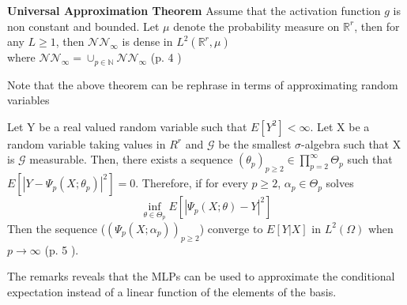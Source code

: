 \begin{theorem}\label{UniversalApproxTheorem}
\textbf{Universal Approximation Theorem} Assume that the activation function $g$ is non constant and bounded. Let $\mu$ denote the probability measure on $\mathbb{R}^r$, then for any $L\geq 1$, then $\mathcal{N} \mathcal{N}_\infty$ is dense in $L^2(\mathbb{R}^r, \mu)$\\
where $\mathcal{N} \mathcal{N}_\infty= \cup_{p\in \mathbb{N}} \mathcal{N} \mathcal{N}_\infty$
(p. 4 \parencite{Lelong19})
\end{theorem}
Note that the above theorem can be rephrase in terms of approximating random variables 
\begin{remark}
Let Y be a real valued random variable such that $E[Y^2]< \infty$. Let X be a random variable taking values in $R^r$ and $\mathcal{G}$ be the smallest $\sigma$-algebra such that X is $\mathcal{G}$ measurable. Then, there exists a sequence $(\theta_p)_{p\geq 2} \in \prod_{p=2}^{\infty} \Theta_{p}$ such that $E[|Y-\Psi_p(X;\theta_p)|^2]=0$. Therefore, if for every $p \geq 2$, $\alpha_p \in \Theta_p$ solves
$$\inf_{\theta\in \Theta_p} E[|\Psi_p(X;\theta)-Y|^2]$$
Then the sequence ($(\Psi_p(X;\alpha_p))_{p\geq 2}$) converge to $E[Y|X]$ in $L^2(\Omega)$ when $p \to \infty$ (p. 5 \parencite{Lelong19}).
\end{remark}
The remarks reveals that the MLPs can be used to approximate the conditional expectation instead of a linear function of the elements of the basis.

